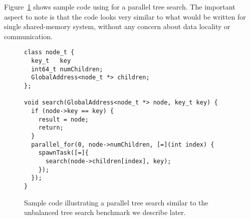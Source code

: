 Figure~\ref{fig:sample} shows sample code using \Grappa for a parallel tree
search. The important aspect to note is that the code looks very similar to
what would be written for single shared-memory system, without any concern about data locality or communication.

\begin{figure}[htbp]
\begin{center}
\begin{scriptsize}
\begin{verbatim}
class node_t {
  key_t   key
  int64_t numChildren;
  GlobalAddress<node_t *> children;
};

void search(GlobalAddress<node_t *> node, key_t key) {
  if (node->key == key) {
    result = node;
    return;
  }
  parallel_for(0, node->numChildren, [=](int index) {
    spawnTask([=]{
      search(node->children[index], key);
    });
  });
}
\end{verbatim}
\end{scriptsize}

    \begin{minipage}{0.95\columnwidth}
      \caption{\label{fig:sample} Sample \Grappa code illustrating a parallel tree search similar to the unbalanced tree search benchmark we describe later.}
    \end{minipage}

\end{center}
\end{figure}

